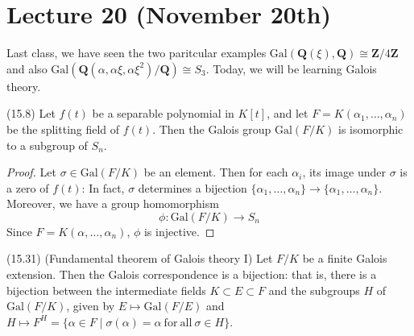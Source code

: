 \section{Lecture 20 (November 20th)}
\begin{rmk}
Last class, we have seen the two paritcular examples $\mathrm{Gal}({\bm Q}(\xi),{\bm Q})\cong {\bm Z}/4{\bm Z}$ and also $\mathrm{Gal}({\bm Q}(\alpha ,\alpha \xi ,\alpha \xi ^2)/{\bm Q})\cong S_{3}$. Today, we will be learning Galois theory.
\end{rmk}
\vspace{2ex}
\begin{cor}
(15.8) Let $f(t)$ be a separable polynomial in $K[t]$, and let $F=K(\alpha_1,\ldots ,\alpha _{n})$ be the splitting field of $f(t)$. Then the Galois group $\mathrm{Gal}(F/K)$ is isomorphic to a subgroup of $S_{n}$. 
\end{cor}
\vspace{2ex}
\begin{proof}
Let $\sigma \in \mathrm{Gal}(F/K)$ be an element. Then for each $\alpha _{i}$, its image under $\sigma $ is a zero of $f(t)$: In fact, $\sigma $ determines a bijection $\{\alpha_1,\ldots ,\alpha _{n}\}\rightarrow \{\alpha_1,\ldots ,\alpha _{n}\}$. Moreover, we have a group homomorphism 
\[\phi :\mathrm{Gal}(F/K)\rightarrow S_{n}\]
Since $F=K(\alpha ,\ldots ,\alpha _{n})$, $\phi $ is injective. 		
\end{proof}
\vspace{2ex}
\begin{thm}
(15.31) (Fundamental theorem of Galois theory I) Let $F/K$ be a finite Galois extension. Then the Galois correspondence is a bijection: that is, there is a bijection between the intermediate fields $K\subset E\subset F$ and the subgroups $H$ of $\mathrm{Gal}(F/K)$, given by $E\mapsto \mathrm{Gal}(F/E)$ and $H\mapsto F^{H}=\{\alpha \in F\;|\;\sigma (\alpha )=\alpha\mathrm{\ for\ all\ }\sigma \in H \}$.
\end{thm}
\vspace{2ex}
